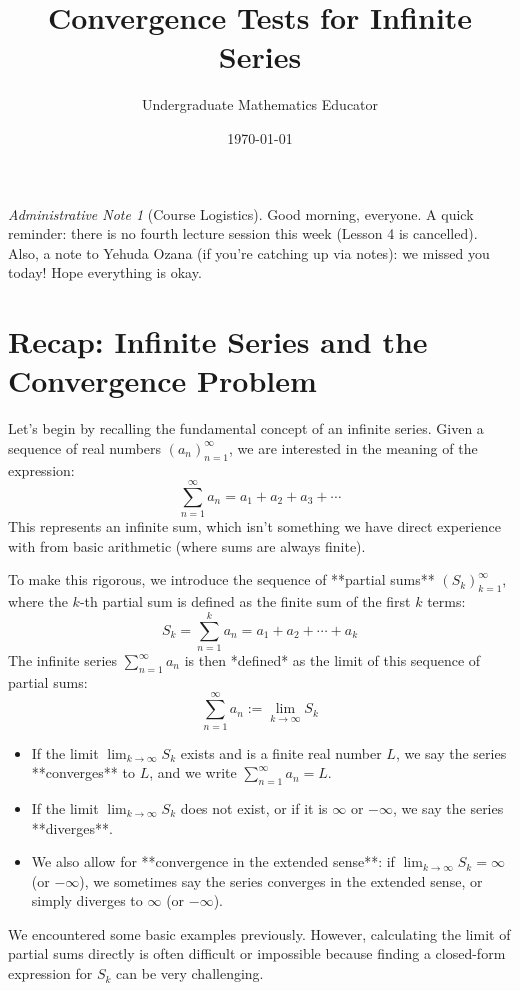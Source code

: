 \documentclass[11pt]{article}
\title{Convergence Tests for Infinite Series}
\author{Undergraduate Mathematics Educator} %
\date{\today}
\theoremstyle{plain}
\theoremstyle{definition}
\theoremstyle{remark}
\theoremstyle{adminstyle}
\newtheorem{adminnote}{Administrative Note}
\begin{document}
\maketitle

\begin{adminnote}[Course Logistics]
Good morning, everyone. A quick reminder: there is no fourth lecture session this week (Lesson 4 is cancelled). Also, a note to Yehuda Ozana (if you're catching up via notes): we missed you today! Hope everything is okay.
\end{adminnote}


\section{Recap: Infinite Series and the Convergence Problem}

Let's begin by recalling the fundamental concept of an infinite series. Given a sequence of real numbers $(a_n)_{n=1}^\infty$, we are interested in the meaning of the expression:
\[ \sum_{n=1}^{\infty} a_n = a_1 + a_2 + a_3 + \dotsb \]
This represents an infinite sum, which isn't something we have direct experience with from basic arithmetic (where sums are always finite).

To make this rigorous, we introduce the sequence of **partial sums** $(S_k)_{k=1}^\infty$, where the $k$-th partial sum is defined as the finite sum of the first $k$ terms:
\[ S_k = \sum_{n=1}^{k} a_n = a_1 + a_2 + \dotsb + a_k \]
The infinite series $\sum_{n=1}^{\infty} a_n$ is then *defined* as the limit of this sequence of partial sums:
\[ \sum_{n=1}^{\infty} a_n := \lim_{k\to\infty} S_k \]
\begin{itemize}
    \item If the limit $\lim_{k\to\infty} S_k$ exists and is a finite real number $L$, we say the series **converges** to $L$, and we write $\sum_{n=1}^{\infty} a_n = L$.
    \item If the limit $\lim_{k\to\infty} S_k$ does not exist, or if it is $\infty$ or $-\infty$, we say the series **diverges**.
    \item We also allow for **convergence in the extended sense**: if $\lim_{k\to\infty} S_k = \infty$ (or $-\infty$), we sometimes say the series converges in the extended sense, or simply diverges to $\infty$ (or $-\infty$).
\end{itemize}

We encountered some basic examples previously. However, calculating the limit of partial sums directly is often difficult or impossible because finding a closed-form expression for $S_k$ can be very challenging.
\end{document}
